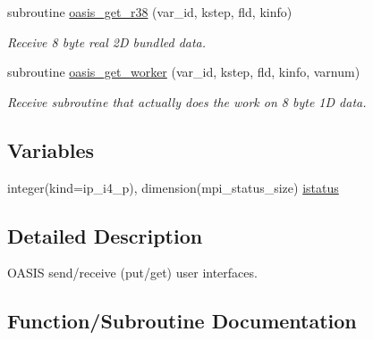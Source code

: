 \begin{DoxyCompactItemize}
subroutine \hyperlink{namespacemod__oasis__getput__interface_a3113b8b9e8d879a631b856a20b30c699}{oasis\+\_\+get\+\_\+r38} (var\+\_\+id, kstep, fld, kinfo)
\begin{DoxyCompactList}\small\item\em Receive 8 byte real 2D bundled data. \end{DoxyCompactList}\item 
subroutine \hyperlink{namespacemod__oasis__getput__interface_a7817d0a31632e3a6c9137e517e7acc3d}{oasis\+\_\+get\+\_\+worker} (var\+\_\+id, kstep, fld, kinfo, varnum)
\begin{DoxyCompactList}\small\item\em Receive subroutine that actually does the work on 8 byte 1D data. \end{DoxyCompactList}\end{DoxyCompactItemize}
\subsection*{Variables}
\begin{DoxyCompactItemize}
\item 
integer(kind=ip\+\_\+i4\+\_\+p), dimension(mpi\+\_\+status\+\_\+size) \hyperlink{namespacemod__oasis__getput__interface_a2ceaaa5740216799f651b8dacb42b239}{istatus}
\end{DoxyCompactItemize}


\subsection{Detailed Description}
O\+A\+S\+IS send/receive (put/get) user interfaces. 

\subsection{Function/\+Subroutine Documentation}
\mbox{\label{namespacemod__oasis__getput__interface_a49f5cde883b1f5210e58c709e944df7c}} 
